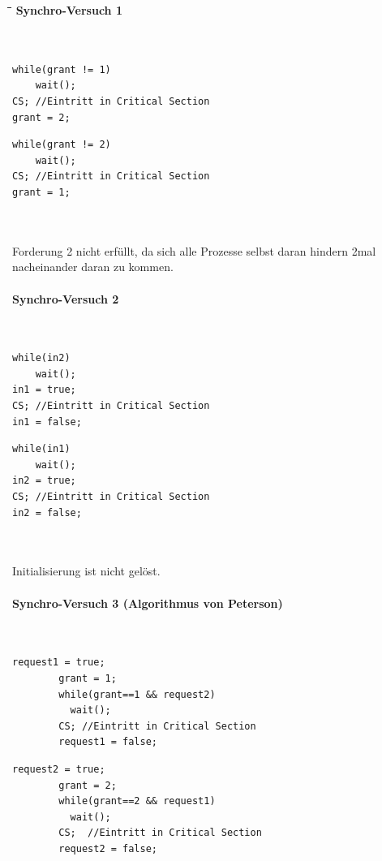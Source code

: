 \begin{tabbing}
  \hspace*{1cm}\=\hspace*{4.2cm}\=\hspace*{3cm}\=\hspace*{2.7cm}\= \kill
\textbf{Synchro-Versuch 1}\\\\
   \> \> \\
  \>\begin{lstlisting}[style=C]
while(grant != 1)
    wait(); 
CS; //Eintritt in Critical Section 
grant = 2; 
    \end{lstlisting} \> \> \>
    \begin{lstlisting}[style=C]
while(grant != 2)
    wait(); 
CS; //Eintritt in Critical Section  
grant = 1; 
    \end{lstlisting} \\\\
    Forderung 2 nicht erfüllt, da sich alle Prozesse selbst daran hindern 2mal nacheinander daran zu kommen.\\\\
    
\textbf{Synchro-Versuch 2}\\\\
    \> \> \\
   \>\begin{lstlisting}[style=C]
while(in2)
    wait(); 
in1 = true; 
CS; //Eintritt in Critical Section 
in1 = false; 
    \end{lstlisting} \> \> \>
    \begin{lstlisting}[style=C]
while(in1)
    wait(); 
in2 = true; 
CS; //Eintritt in Critical Section 
in2 = false; 
    \end{lstlisting} \\\\
    Initialisierung ist nicht gelöst.\\\\

\textbf{Synchro-Versuch 3 (Algorithmus von Peterson)}\\\\
    \> \> \\
   \>\begin{lstlisting}[style=C]
        request1 = true; 
        grant = 1; 
        while(grant==1 && request2)
          wait(); 
        CS; //Eintritt in Critical Section  
        request1 = false; 
    \end{lstlisting} \> \> \>
    \begin{lstlisting}[style=C]
        request2 = true; 
        grant = 2; 
        while(grant==2 && request1)
          wait(); 
        CS;  //Eintritt in Critical Section 
        request2 = false;  
    \end{lstlisting} \\ 
\end{tabbing}
